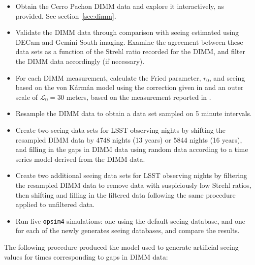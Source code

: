 \documentclass[DM,authoryear,toc]{lsstdoc}
\begin{document}
\begin{itemize}

  \item Obtain the Cerro Pachon DIMM data and explore it
    interactively, as provided. See section~\ref{sec:dimm}.
  \item Validate the DIMM data through comparison with seeing
    estimated using DECam and Gemini South imaging. Examine the
    agreement between these data sets as a function of the Strehl
    ratio recorded for the DIMM, and filter the DIMM data accordingly
    (if necessary).
  \item For each DIMM measurement, calculate the Fried parameter,
    $r_{0}$, and seeing based on the von K\'arm\'an model using the
    correction given in \cite{2002PASP..114.1156T} and an outer scale
    of $\mathcal{L}_{0} = 30$ meters, based on the measurement
    reported in \cite{2000ApOpt..39.5415Z}.
  \item Resample the DIMM data to obtain a data set sampled on 5
    minute intervals.
  \item Create two seeing data sets for LSST observing nights by
    shifting the resampled DIMM data by 4748 nights (13 years) or 5844
    nights (16 years), and filling in the gaps in DIMM data using
    random data according to a time series model derived from the DIMM
    data.
  \item Create two additional seeing data sets for LSST observing
    nights by filtering the resampled DIMM data to remove data with
    suspiciously low Strehl ratios, then shifting and filling in the
    filtered data following the same procedure applied to unfiltered
    data.
  \item Run five \texttt{opsim4} simulations: one using the default seeing
    database, and one for each of the newly generates seeing
    databases, and compare the results.
\end{itemize}

The following procedure produced the model used to generate artificial seeing values for times corresponding to gaps in DIMM data:
\end{document}
